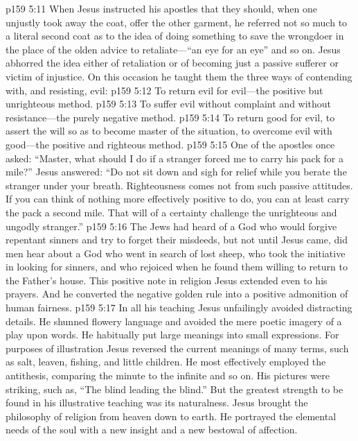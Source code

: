 \vs p159 5:11 When Jesus instructed his apostles that they should, when one unjustly took away the coat, offer the other garment, he referred not so much to a literal second coat as to the idea of doing something  to save the wrongdoer in the place of the olden advice to retaliate---“an eye for an eye” and so on. Jesus abhorred the idea either of retaliation or of becoming just a passive sufferer or victim of injustice. On this occasion he taught them the three ways of contending with, and resisting, evil:
\pc \vs p159 5:12 \bibnobreakspace To return evil for evil---the positive but unrighteous method.
\vs p159 5:13 \bibnobreakspace To suffer evil without complaint and without resistance---the purely negative method.
\vs p159 5:14 \bibnobreakspace To return good for evil, to assert the will so as to become master of the situation, to overcome evil with good---the positive and righteous method.
\pc \vs p159 5:15 One of the apostles once asked: “Master, what should I do if a stranger forced me to carry his pack for a mile?” Jesus answered: \textcolor{ubdarkred}{“Do not sit down and sigh for relief while you berate the stranger under your breath. Righteousness comes not from such passive attitudes. If you can think of nothing more effectively positive to do, you can at least carry the pack a second mile. That will of a certainty challenge the unrighteous and ungodly stranger.”}
\vs p159 5:16 The Jews had heard of a God who would forgive repentant sinners and try to forget their misdeeds, but not until Jesus came, did men hear about a God who went in search of lost sheep, who took the initiative in looking for sinners, and who rejoiced when he found them willing to return to the Father’s house. This positive note in religion Jesus extended even to his prayers. And he converted the negative golden rule into a positive admonition of human fairness.
\vs p159 5:17 In all his teaching Jesus unfailingly avoided distracting details. He shunned flowery language and avoided the mere poetic imagery of a play upon words. He habitually put large meanings into small expressions. For purposes of illustration Jesus reversed the current meanings of many terms, such as salt, leaven, fishing, and little children. He most effectively employed the antithesis, comparing the minute to the infinite and so on. His pictures were striking, such as, \textcolor{ubdarkred}{“The blind leading the blind.”} But the greatest strength to be found in his illustrative teaching was its naturalness. Jesus brought the philosophy of religion from heaven down to earth. He portrayed the elemental needs of the soul with a new insight and a new bestowal of affection.
